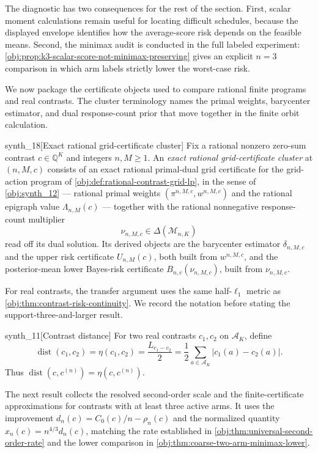 The diagnostic has two consequences for the rest of the section. First, scalar moment calculations remain useful for locating difficult schedules, because the displayed envelope identifies how the average-score risk depends on the feasible means. Second, the minimax audit is conducted in the full labeled experiment: \cref{obj:prop:k3-scalar-score-not-minimax-preserving} gives an explicit \(n=3\) comparison in which arm labels strictly lower the worst-case risk.

We now package the certificate objects used to compare rational finite programs and real contrasts. The cluster terminology names the primal weights, barycenter estimator, and dual response-count prior that move together in the finite orbit calculation.

\begin{definitionv}{synth_18}[Exact rational grid-certificate cluster]
Fix a rational nonzero zero-sum contrast \(c\in\mathbb Q^K\) and integers \(n,M\ge1\). An \emph{exact rational grid-certificate cluster} at \((n,M,c)\) consists of an exact rational primal-dual grid certificate for the grid-action program of \cref{obj:def:rational-contrast-grid-lp}, in the sense of \cref{obj:synth_12} --- rational primal weights \((\pi^{n,M,c},w^{n,M,c})\) and the rational epigraph value \(\Lambda_{n,M}(c)\) --- together with the rational nonnegative response-count multiplier
\[
\nu_{n,M,c}\in\Delta(\mathcal M_{n,K})
\]
read off its dual solution. Its derived objects are the barycenter estimator \(\delta_{n,M,c}\) and the upper risk certificate \(U_{n,M}(c)\), both built from \(w^{n,M,c}\), and the posterior-mean lower Bayes-risk certificate \(B_{n,c}(\nu_{n,M,c})\), built from \(\nu_{n,M,c}\).
\end{definitionv}

For real contrasts, the transfer argument uses the same half-\(\ell_1\) metric as \cref{obj:thm:contrast-risk-continuity}. We record the notation before stating the support-three-and-larger result.

\begin{definitionv}{synth_11}[Contrast distance]
For two real contrasts $c_1,c_2$ on $\mathcal A_K$, define
\[
\operatorname{dist}(c_1,c_2)=\eta(c_1,c_2)=\frac{L_{c_1-c_2}}2=\frac12\sum_{a\in\mathcal A_K}|c_1(a)-c_2(a)|.
\]
Thus $\operatorname{dist}(c,c^{(n)})=\eta(c,c^{(n)})$.
\end{definitionv}

The next result collects the resolved second-order scale and the finite-certificate approximations for contrasts with at least three active arms. It uses the improvement \(d_n(c)=C_0(c)/n-\rho_n(c)\) and the normalized quantity \(x_n(c)=n^{4/3}d_n(c)\), matching the rate established in \cref{obj:thm:universal-second-order-rate} and the lower comparison in \cref{obj:thm:coarse-two-arm-minimax-lower}.

